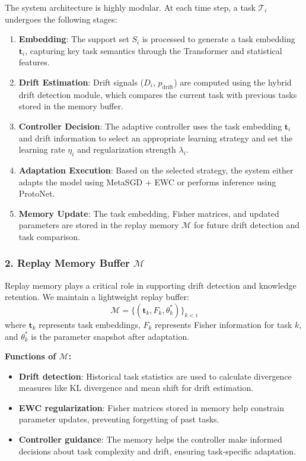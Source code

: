 \documentclass[conference]{IEEEtran}
\begin{document}
The system architecture is highly modular. At each time step, a task $\mathcal{T}_i$ undergoes the following stages:
\begin{enumerate}
    \item \textbf{Embedding}: The support set $S_i$ is processed to generate a task embedding $\mathbf{t}_i$, capturing key task semantics through the Transformer and statistical features.
    \item \textbf{Drift Estimation}: Drift signals ($D_i$, $p_{\text{drift}}$) are computed using the hybrid drift detection module, which compares the current task with previous tasks stored in the memory buffer.
    \item \textbf{Controller Decision}: The adaptive controller uses the task embedding $\mathbf{t}_i$ and drift information to select an appropriate learning strategy and set the learning rate $\eta_i$ and regularization strength $\lambda_i$.
    \item \textbf{Adaptation Execution}: Based on the selected strategy, the system either adapts the model using MetaSGD + EWC or performs inference using ProtoNet.
    \item \textbf{Memory Update}: The task embedding, Fisher matrices, and updated parameters are stored in the replay memory $\mathcal{M}$ for future drift detection and task comparison.
\end{enumerate}

\subsubsection*{2. Replay Memory Buffer $\mathcal{M}$}

Replay memory plays a critical role in supporting drift detection and knowledge retention. We maintain a lightweight replay buffer:
\[
\mathcal{M} = \{ (\mathbf{t}_k, F_k, \theta_k^*) \}_{k < i}
\]
where $\mathbf{t}_k$ represents task embeddings, $F_k$ represents Fisher information for task $k$, and $\theta_k^*$ is the parameter snapshot after adaptation.

\textbf{Functions of $\mathcal{M}$:}
\begin{itemize}
    \item \textbf{Drift detection}: Historical task statistics are used to calculate divergence measures like KL divergence and mean shift for drift estimation.
    \item \textbf{EWC regularization}: Fisher matrices stored in memory help constrain parameter updates, preventing forgetting of past tasks.
    \item \textbf{Controller guidance}: The memory helps the controller make informed decisions about task complexity and drift, ensuring task-specific adaptation.
\end{itemize}
\end{document}
